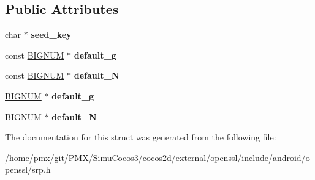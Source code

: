 \subsection*{Public Attributes}
\begin{DoxyCompactItemize}
\item 
\mbox{\label{structSRP__VBASE__st_a8c064b93286572e017c965de83fe7101}} 
char $\ast$ {\bfseries seed\+\_\+key}
\item 
\mbox{\label{structSRP__VBASE__st_a9650ccfd69b621a24684a94e9023a41c}} 
const \hyperlink{structbignum__st}{B\+I\+G\+N\+UM} $\ast$ {\bfseries default\+\_\+g}
\item 
\mbox{\label{structSRP__VBASE__st_a0b78b5b5c06ced824a2338752852e209}} 
const \hyperlink{structbignum__st}{B\+I\+G\+N\+UM} $\ast$ {\bfseries default\+\_\+N}
\item 
\mbox{\label{structSRP__VBASE__st_ad5245233a409421484ed56f3e6eba454}} 
\hyperlink{structbignum__st}{B\+I\+G\+N\+UM} $\ast$ {\bfseries default\+\_\+g}
\item 
\mbox{\label{structSRP__VBASE__st_a5b98cadde5a5d7c0b32f5ce9596dca87}} 
\hyperlink{structbignum__st}{B\+I\+G\+N\+UM} $\ast$ {\bfseries default\+\_\+N}
\end{DoxyCompactItemize}


The documentation for this struct was generated from the following file\+:\begin{DoxyCompactItemize}
\item 
/home/pmx/git/\+P\+M\+X/\+Simu\+Cocos3/cocos2d/external/openssl/include/android/openssl/srp.\+h\end{DoxyCompactItemize}
